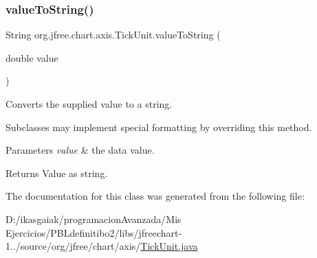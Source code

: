 \subsubsection{\texorpdfstring{value\+To\+String()}{valueToString()}}
{\footnotesize\ttfamily String org.\+jfree.\+chart.\+axis.\+Tick\+Unit.\+value\+To\+String (\begin{DoxyParamCaption}\item[{double}]{value }\end{DoxyParamCaption})}

Converts the supplied value to a string. 

Subclasses may implement special formatting by overriding this method.


\begin{DoxyParams}{Parameters}
{\em value} & the data value.\\
\hline
\end{DoxyParams}
\begin{DoxyReturn}{Returns}
Value as string. 
\end{DoxyReturn}


The documentation for this class was generated from the following file\+:\begin{DoxyCompactItemize}
\item 
D\+:/ikasgaiak/programacion\+Avanzada/\+Mis Ejercicios/\+P\+B\+Ldefinitibo2/libs/jfreechart-\/1../source/org/jfree/chart/axis/\mbox{\hyperlink{_tick_unit_8java}{Tick\+Unit.\+java}}\end{DoxyCompactItemize}
